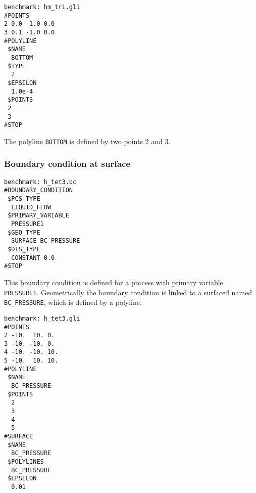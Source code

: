 {\begin{verbatim}
benchmark: hm_tri.gli
#POINTS
2 0.0 -1.0 0.0
3 0.1 -1.0 0.0
#POLYLINE
 $NAME
  BOTTOM
 $TYPE
  2
 $EPSILON
  1.0e-4
 $POINTS
 2
 3
#STOP
\end{verbatim}

The polyline \texttt{BOTTOM} is defined by two points 2 and 3.

\subsubsection{Boundary condition at surface}

\begin{verbatim}
benchmark: h_tet3.bc
#BOUNDARY_CONDITION
 $PCS_TYPE
  LIQUID_FLOW
 $PRIMARY_VARIABLE
  PRESSURE1
 $GEO_TYPE
  SURFACE BC_PRESSURE
 $DIS_TYPE
  CONSTANT 0.0
#STOP
\end{verbatim}

This boundary condition is defined for a process with primary
variable \texttt{PRESSURE1}. Geometrically the boundary condition
is linked to a surfaced named \texttt{BC\_PRESSURE}, which is
defined by a polyline.

\begin{verbatim}
benchmark: h_tet3.gli
#POINTS
2 -10.  10. 0.
3 -10. -10. 0.
4 -10. -10. 10.
5 -10.  10. 10.
#POLYLINE
 $NAME
  BC_PRESSURE
 $POINTS
  2
  3
  4
  5
#SURFACE
 $NAME
  BC_PRESSURE
 $POLYLINES
  BC_PRESSURE
 $EPSILON
  0.01
\end{verbatim}

}


